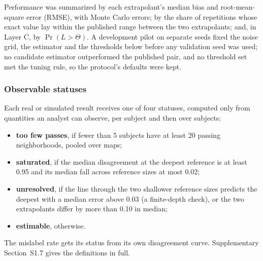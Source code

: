 \documentclass[11pt]{article}
\begin{document}
Performance was summarized by each extrapolant's median bias and root-mean-square error (RMSE), with Monte Carlo errors; by the share of repetitions whose exact value lay within the published range between the two extrapolants; and, in Layer C, by $\Pr(L>\Theta)$.
A development pilot on separate seeds fixed the noise grid, the estimator and the thresholds below before any validation seed was used; no candidate estimator outperformed the published pair, and no threshold set met the tuning rule, so the protocol's defaults were kept.

\subsubsection{Observable statuses}\label{sec:status}
Each real or simulated result receives one of four statuses, computed only from quantities an analyst can observe, per subject and then over subjects:
\begin{itemize}[leftmargin=*]
  \item \textbf{too few passes}, if fewer than 5 subjects have at least 20 passing neighborhoods, pooled over maps;
  \item \textbf{saturated}, if the median disagreement at the deepest reference is at least 0.95 and its median fall across reference sizes at most 0.02;
  \item \textbf{unresolved}, if the line through the two shallower reference sizes predicts the deepest with a median error above 0.03 (a finite-depth check), or the two extrapolants differ by more than 0.10 in median;
  \item \textbf{estimable}, otherwise.
\end{itemize}
The mislabel rate gets its status from its own disagreement curve.
Supplementary Section~S1.7 gives the definitions in full.
\end{document}
